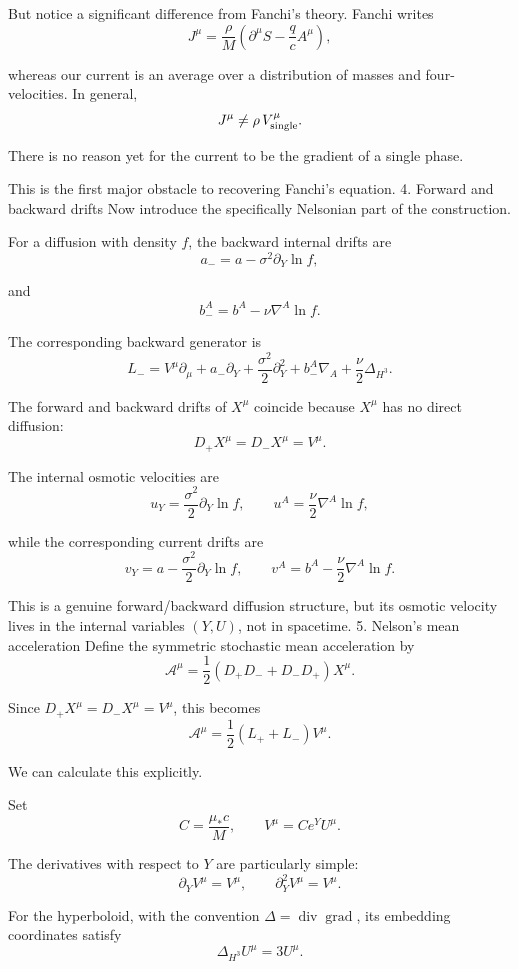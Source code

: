 But notice a significant difference from Fanchi's theory. Fanchi writes
\[
J^\mu=\frac{\rho}{M}
\left(\partial^\mu S-\frac qc A^\mu\right),
\tag{9}
\]

whereas our current is an average over a distribution of masses and four-velocities. In general,
\[
J^\mu\ne \rho\,V^\mu_{\rm single}.
\]

There is no reason yet for the current to be the gradient of a single phase.

This is the first major obstacle to recovering Fanchi's equation.
4. Forward and backward drifts
Now introduce the specifically Nelsonian part of the construction.

For a diffusion with density \(f\), the backward internal drifts are
\[
a_-=a-\sigma^2\partial_Y\ln f,
\tag{10}
\]

and
\[
b_-^A=b^A-\nu\nabla^A\ln f.
\tag{11}
\]

The corresponding backward generator is
\[
L_-=
V^\mu\partial_\mu
+a_-\partial_Y+\frac{\sigma^2}{2}\partial_Y^2
+b_-^A\nabla_A+\frac{\nu}{2}\Delta_{H^3}.
\tag{12}
\]

The forward and backward drifts of \(X^\mu\) coincide because \(X^\mu\) has no direct diffusion:
\[
D_+X^\mu=D_-X^\mu=V^\mu.
\tag{13}
\]

The internal osmotic velocities are
\[
u_Y=\frac{\sigma^2}{2}\partial_Y\ln f,
\qquad
u^A=\frac{\nu}{2}\nabla^A\ln f,
\tag{14}
\]

while the corresponding current drifts are
\[
v_Y=a-\frac{\sigma^2}{2}\partial_Y\ln f,
\qquad
v^A=b^A-\frac{\nu}{2}\nabla^A\ln f.
\tag{15}
\]

This is a genuine forward/backward diffusion structure, but its osmotic velocity lives in the internal variables \((Y,U)\), not in spacetime.
5. Nelson's mean acceleration
Define the symmetric stochastic mean acceleration by
\[
\mathcal A^\mu
=\frac12\left(D_+D_-+D_-D_+\right)X^\mu.
\tag{16}
\]

Since \(D_+X^\mu=D_-X^\mu=V^\mu\), this becomes
\[
\mathcal A^\mu=\frac12(L_++L_-)V^\mu.
\tag{17}
\]

We can calculate this explicitly.

Set
\[
C=\frac{\mu_*c}{M},\qquad V^\mu=Ce^YU^\mu.
\]

The derivatives with respect to \(Y\) are particularly simple:
\[
\partial_YV^\mu=V^\mu,\qquad
\partial_Y^2V^\mu=V^\mu.
\tag{18}
\]

For the hyperboloid, with the convention
\(\Delta=\operatorname{div}\operatorname{grad}\), its embedding coordinates satisfy
\[
\Delta_{H^3}U^\mu=3U^\mu.
\tag{19}
\]

